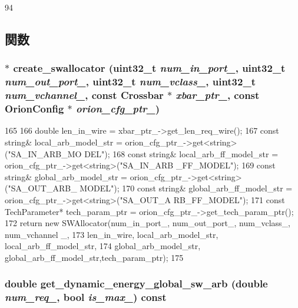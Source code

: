 \begin{DoxyCode}
94 {}
\end{DoxyCode}


\subsection{関数}
\hypertarget{classSWAllocator_a3f85ab25a936f7b8df905a7822e755d2}{
\subsubsection[{create\_\-swallocator}]{ $\ast$ create\_\-swallocator ({\bf uint32\_\-t} {\em num\_\-in\_\-port\_\-}, \/  {\bf uint32\_\-t} {\em num\_\-out\_\-port\_\-}, \/  {\bf uint32\_\-t} {\em num\_\-vclass\_\-}, \/  {\bf uint32\_\-t} {\em num\_\-vchannel\_\-}, \/  const {\bf Crossbar} $\ast$ {\em xbar\_\-ptr\_\-}, \/  const {\bf OrionConfig} $\ast$ {\em orion\_\-cfg\_\-ptr\_\-})}}
\label{classSWAllocator_a3f85ab25a936f7b8df905a7822e755d2}



\begin{DoxyCode}
165 {
166     double len_in_wire = xbar_ptr_->get_len_req_wire();
167     const string& local_arb_model_str = orion_cfg_ptr_->get<string>("SA_IN_ARB_MO
      DEL");
168     const string& local_arb_ff_model_str = orion_cfg_ptr_->get<string>("SA_IN_ARB
      _FF_MODEL");
169     const string& global_arb_model_str = orion_cfg_ptr_->get<string>("SA_OUT_ARB_
      MODEL");
170     const string& global_arb_ff_model_str = orion_cfg_ptr_->get<string>("SA_OUT_A
      RB_FF_MODEL");
171     const TechParameter* tech_param_ptr = orion_cfg_ptr_->get_tech_param_ptr();
172     return new SWAllocator(num_in_port_, num_out_port_, num_vclass_, num_vchannel
      _, 
173             len_in_wire, local_arb_model_str, local_arb_ff_model_str, 
174             global_arb_model_str, global_arb_ff_model_str,tech_param_ptr);
175 }
\end{DoxyCode}
\hypertarget{classSWAllocator_a93eb1da62d2bce50a4b86903183e801e}{
\subsubsection[{get\_\-dynamic\_\-energy\_\-global\_\-sw\_\-arb}]{\setlength{\rightskip}{0pt plus 5cm}double get\_\-dynamic\_\-energy\_\-global\_\-sw\_\-arb (double {\em num\_\-req\_\-}, \/  bool {\em is\_\-max\_\-}) const}}
\label{classSWAllocator_a93eb1da62d2bce50a4b86903183e801e}



